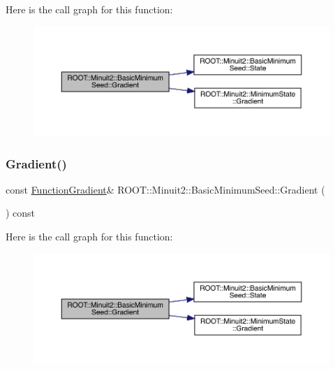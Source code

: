 Here is the call graph for this function\+:
\nopagebreak
\begin{figure}[H]
\begin{center}
\leavevmode
\includegraphics[width=350pt]{de/d50/classROOT_1_1Minuit2_1_1BasicMinimumSeed_ab61377b63a177c93629ccb3e69e173db_cgraph}
\end{center}
\end{figure}
\mbox{\label{classROOT_1_1Minuit2_1_1BasicMinimumSeed_ab61377b63a177c93629ccb3e69e173db}} 
\subsubsection{\texorpdfstring{Gradient()}{Gradient()}\hspace{0.1cm}{\footnotesize\ttfamily [2/2]}}
{\footnotesize\ttfamily const \mbox{\hyperlink{classROOT_1_1Minuit2_1_1FunctionGradient}{Function\+Gradient}}\& R\+O\+O\+T\+::\+Minuit2\+::\+Basic\+Minimum\+Seed\+::\+Gradient (\begin{DoxyParamCaption}{ }\end{DoxyParamCaption}) const\hspace{0.3cm}{\ttfamily [inline]}}

Here is the call graph for this function\+:
\nopagebreak
\begin{figure}[H]
\begin{center}
\leavevmode
\includegraphics[width=350pt]{de/d50/classROOT_1_1Minuit2_1_1BasicMinimumSeed_ab61377b63a177c93629ccb3e69e173db_cgraph}
\end{center}
\end{figure}
\mbox{\label{classROOT_1_1Minuit2_1_1BasicMinimumSeed_ab53f2619d2b6be3d3d9303f8de29ab28}} 
